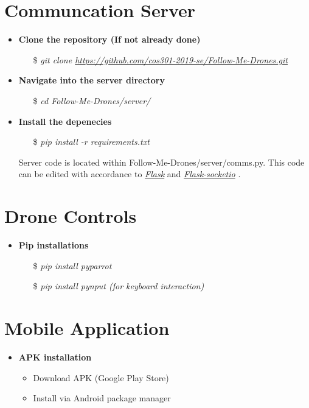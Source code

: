 \section{Communcation Server}
\begin{itemize}
    \item \textbf{Clone the repository (If not already done)}
        \begin{itemize}
            \item[\$] \textit{git clone \url{https://github.com/cos301-2019-se/Follow-Me-Drones.git}}
        \end{itemize}
    \item \textbf{Navigate into the server directory}
        \begin{itemize}
            \item[\$] \textit{cd Follow-Me-Drones/server/}
        \end{itemize}
    \item \textbf{Install the depenecies}
        \begin{itemize}
            \item[\$] \textit{pip install -r requirements.txt}
        \end{itemize}

        Server code is located within Follow-Me-Drones/server/comms.py. This code can be edited with accordance to \href{https://pypi.org/project/Flask/}{\textit{Flask}} \cite{Flask} and \href{https://flask-socketio.readthedocs.io/en/latest/}{\textit{Flask-socketio}} \cite{Flask-socketio}.
\end{itemize}


\section{Drone Controls}

\begin{itemize}
    \item \textbf{Pip installations}
        \begin{itemize}
            \item[\$] \textit{pip install pyparrot}
            \item[\$] \textit{pip install pynput (for keyboard interaction)} 
        \end{itemize}
\end{itemize}

\section{Mobile Application}

\begin{itemize}
	\item \textbf{APK installation}
        \begin{itemize}
			\item  Download APK (Google Play Store) 
			\item  Install via Android package manager 
        \end{itemize}
\end{itemize}
